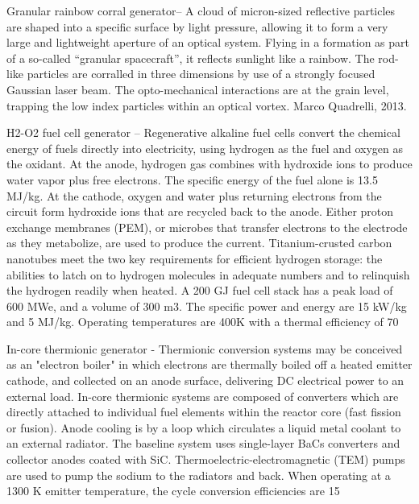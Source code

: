 \documentclass[a4paper]{book}
\begin{document}
Granular rainbow corral generator– A cloud of micron-sized reflective particles are shaped into a specific surface by light pressure, allowing it to form a very large and lightweight aperture of an optical system. Flying in a formation as part of a so-called “granular spacecraft”, it reflects sunlight like a rainbow. The rod-like particles are corralled in three dimensions by use of a strongly focused Gaussian laser beam. The opto-mechanical interactions are at the grain level, trapping the low index particles within an optical vortex. Marco Quadrelli, 2013.
 
H2-O2 fuel cell generator – Regenerative alkaline fuel cells convert the chemical energy of fuels directly into electricity, using hydrogen as the fuel and oxygen as the oxidant.  At the anode, hydrogen gas combines with hydroxide ions to produce water vapor plus free electrons.  The specific energy of the fuel alone is 13.5 MJ/kg.  At the cathode, oxygen and water plus returning electrons from the circuit form hydroxide ions that are recycled back to the anode. Either proton exchange membranes (PEM), or microbes that transfer electrons to the electrode as they metabolize, are used to produce the current. Titanium-crusted carbon nanotubes meet the two key requirements for efficient hydrogen storage: the abilities to latch on to hydrogen molecules in adequate numbers and to relinquish the hydrogen readily when heated.  A 200 GJ fuel cell stack has a peak load of 600 MWe, and a volume of 300 m3.  The specific power and energy are 15 kW/kg and 5 MJ/kg.  Operating temperatures are 400K with a thermal efficiency of 70%
 
In-core thermionic generator - Thermionic conversion systems may be conceived as an "electron boiler" in which electrons are thermally boiled off a heated emitter cathode, and collected on an anode surface, delivering DC electrical power to an external load. In-core thermionic systems are composed of converters which are directly attached to individual fuel elements within the reactor core (fast fission or fusion). Anode cooling is by a loop which circulates a liquid metal coolant to an external radiator. The baseline system uses single-layer BaCs converters and collector anodes coated with SiC.  Thermoelectric-electromagnetic (TEM) pumps are used to pump the sodium to the radiators and back. When operating at a 1300 K emitter temperature, the cycle conversion efficiencies are 15%
 
\end{document}
